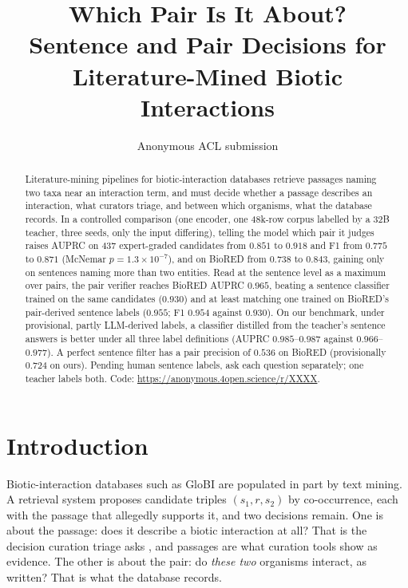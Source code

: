 \documentclass[11pt]{article}
\title{Which Pair Is It About?\\
Sentence and Pair Decisions for Literature-Mined Biotic Interactions}
\author{Anonymous ACL submission}
\begin{document}
\maketitle

\begin{abstract}
Literature-mining pipelines for biotic-interaction databases retrieve passages naming two taxa near
an interaction term, and must decide whether a passage describes an interaction, what curators
triage, and between which organisms, what the database records. In a controlled comparison (one
encoder, one 48k-row corpus labelled by a 32B teacher, three seeds, only the input differing),
telling the model which pair it judges raises AUPRC on 437 expert-graded candidates from $0.851$ to
$0.918$ and F1 from $0.775$ to $0.871$ (McNemar $p = 1.3\times10^{-7}$), and on BioRED from
$0.738$ to $0.843$, gaining only on sentences naming more than two entities. Read at the sentence
level as a maximum over pairs, the pair verifier reaches BioRED AUPRC $0.965$, beating a sentence
classifier trained on the same candidates ($0.930$) and at least matching one trained on BioRED's
pair-derived sentence labels ($0.955$; F1 $0.954$ against $0.930$). On our benchmark, under
provisional, partly LLM-derived labels, a classifier distilled from the teacher's sentence answers
is better under all three label definitions (AUPRC $0.985$--$0.987$ against $0.966$--$0.977$). A
perfect sentence filter has a pair precision of $0.536$ on BioRED (provisionally $0.724$ on ours).
Pending human sentence labels, ask each question separately; one teacher labels both.
Code: \url{https://anonymous.4open.science/r/XXXX}.
\end{abstract}

\section{Introduction}
\label{sec:intro}

Biotic-interaction databases such as GloBI \citep{poelen2014global} are populated in part by text
mining. A retrieval system proposes candidate triples $(s_1, r, s_2)$ by co-occurrence, each with
the passage that allegedly supports it, and two decisions remain. One is about the passage: does
it describe a biotic interaction at all? That is the decision curation triage asks
\citep{krallinger2008overview,islamajdogan2019overview}, and passages are what curation tools show
as evidence. The other is about the pair: do \emph{these two} organisms interact, as written? That
is what the database records.
\end{document}

